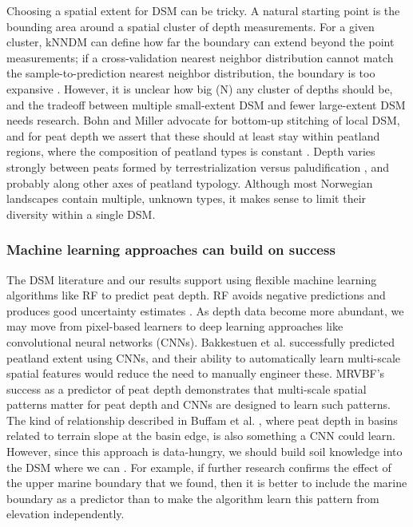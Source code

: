 \documentclass[soil, manuscript]{copernicus}
\begin{document}
Choosing a spatial extent for DSM can be tricky.
A natural starting point is the bounding area around a spatial cluster of depth measurements.
For a given cluster, kNNDM can define how far the boundary can extend beyond the point measurements; if a cross-validation nearest neighbor distribution cannot match the sample-to-prediction nearest neighbor distribution, the boundary is too expansive \citep{meyerMachineLearningbasedGlobal2022, linnenbrinkKNNDMCVKfold2024}.
However, it is unclear how big (N) any cluster of depths should be, and the tradeoff between multiple small-extent DSM and fewer large-extent DSM needs research.
Bohn and Miller \citeyearpar{bohnLocallyEnhancedDigital2024} advocate for bottom-up stitching of local DSM, and for peat depth we assert that these should at least stay within peatland regions, where the composition of peatland types is constant \citep[e.g.][]{moenVegetasjonstyper1998}.
Depth varies strongly between peats formed by terrestrialization versus paludification \citep{buffamFillingHolesRegional2010}, and probably along other axes of peatland typology.
Although most Norwegian landscapes contain multiple, unknown types, it makes sense to limit their diversity within a single DSM.

\subsubsection{Machine learning approaches can build on success}

The DSM literature and our results support using flexible machine learning algorithms like RF to predict peat depth.
RF avoids negative predictions \citep[c.f.][]{kogantiMappingPeatDepth2023} and produces good uncertainty estimates \citep[our study,][]{vaysseUsingQuantileRegression2017, takoutsingComparingPredictionPerformance2022}.
As depth data become more abundant, we may move from pixel-based learners to deep learning approaches like convolutional neural networks (CNNs).
Bakkestuen et al. \citeyearpar{bakkestuenDelineationWetlandAreas2023} successfully predicted peatland extent using CNNs, and their ability to automatically learn multi-scale spatial features would reduce the need to manually engineer these.
MRVBF's success as a predictor of peat depth demonstrates that multi-scale spatial patterns matter for peat depth and CNNs are designed to learn such patterns.
The kind of relationship described in Buffam et al. \citeyearpar{buffamFillingHolesRegional2010}, where peat depth in basins related to terrain slope at the basin edge, is also something a CNN could learn.
However, since this approach is data-hungry, we should build soil knowledge into the DSM where we can \citep{minasnySoilScienceInformedMachine2024}.
For example, if further research confirms the effect of the upper marine boundary that we found, then it is better to include the marine boundary as a predictor than to make the algorithm learn this pattern from elevation independently.
\end{document}
